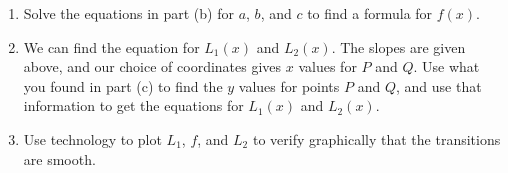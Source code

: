 \documentclass{article}
\begin{document}
\begin{enumerate}
\begin{enumerate}[label=(\alph*)]
\item Solve the equations in part (b) for $ a $, $ b $, and $ c $ to find a formula for $ f(x) $.
\item We can find the equation for $L_1(x)$ and $L_2(x)$. The slopes are given above, and our choice of coordinates gives $x$ values for $P$ and $Q$. Use what you found in part (c) to find the $y$ values for points $P$ and $Q$, and use that information to get the equations for $L_1(x)$ and $L_2(x)$.

\item Use technology to plot $ L_1 $, $ f $, and $ L_2 $ to verify graphically that the transitions are smooth.

\end{enumerate}
\end{enumerate}
\end{document}
